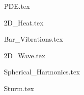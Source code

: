 \documentclass[a4paper, 12pt]{report}
\begin{document}
\begin{center}
\begin{comment}
Start Level: Chapter
End Level: Chapter
Aditional Comments:
\end{comment}
{PDE.tex}
\begin{comment}
Start Level: Chapter
End Level: Chapter
Aditional Comments:
\end{comment}
{2D_Heat.tex}
\begin{comment}
Start Level: Chapter
End Level: Chapter
Aditional Comments:
\end{comment}
{Bar_Vibrations.tex}
\begin{comment}
Start Level: Chapter
End Level: Chapter
Aditional Comments:
\end{comment}
{2D_Wave.tex}
\begin{comment}
Start Level: Chapter
End Level: Chapter
Aditional Comments:
\end{comment}
{Spherical_Harmonics.tex}
\begin{comment}
Start Level: Chapter
End Level: Chapter
Aditional Comments:
\end{comment}
{Sturm.tex}
\begin{comment}
Start Level: Chapter
End Level: Chapter
Aditional Comments:
\end{comment}

\end{center}
\end{document}
